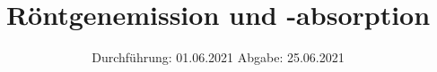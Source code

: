 

\subject{V602}
\title{Röntgenemission und -absorption}
\date{%
  Durchführung: 01.06.2021
  \hspace{3em}
  Abgabe: 25.06.2021
}



\maketitle
\thispagestyle{empty}
\tableofcontents
\newpage







\printbibliography{}


